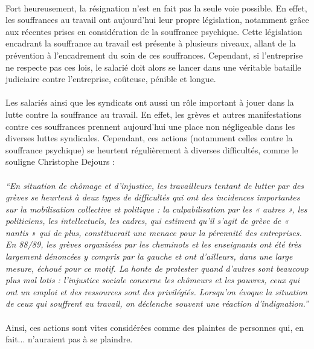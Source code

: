 \documentclass{report}
\begin{document}
		\paragraph{}
			Fort heureusement, la résignation n'est en fait pas la seule voie possible. En effet, les souffrances au travail ont aujourd'hui leur propre législation, notamment grâce aux récentes prises en considération de la souffrance psychique. Cette législation encadrant la souffrance au travail est présente à plusieurs niveaux, allant de la prévention à l'encadrement du soin de ces souffrances. Cependant, si l'entreprise ne respecte pas ces lois, le salarié doit alors se lancer dans une véritable bataille judiciaire contre l'entreprise, coûteuse, pénible et longue.
		\paragraph{}
			Les salariés ainsi que les syndicats ont aussi un rôle important à jouer dans la lutte contre la souffrance au travail. En effet, les grèves et autres manifestations contre ces souffrances prennent aujourd'hui une place non négligeable dans les diverses luttes syndicales. Cependant, ces actions (notamment celles contre la souffrance psychique) se heurtent régulièrement à diverses difficultés, comme le souligne Christophe Dejours : 
		\paragraph{}
			\textit{
			``En situation de chômage et d’injustice, les travailleurs tentant de lutter par des grèves se heurtent à deux types de 
			difficultés qui ont des incidences importantes sur la mobilisation collective et politique : la culpabilisation par les 
			« autres », les politiciens, les intellectuels, les cadres, qui estiment qu’il s’agit de grève de « nantis » qui de plus, 
			constituerait une menace pour la pérennité des entreprises. En 88/89, les grèves organisées par les cheminots et les 
			enseignants ont été très largement dénoncées y compris par la gauche et ont d’ailleurs, dans une large mesure, échoué 
			pour ce motif. 
			La honte de protester quand d’autres sont beaucoup plus mal lotis : l’injustice sociale concerne les chômeurs et les 
			pauvres, ceux qui ont un emploi et des ressources sont des privilégiés. Lorsqu’on évoque la situation de ceux qui 
			souffrent au travail, on déclenche souvent une réaction d’indignation.''}
		\paragraph{}
			Ainsi, ces actions sont vites considérées comme des plaintes de personnes qui, en fait... n'auraient pas à se plaindre.
\end{document}

